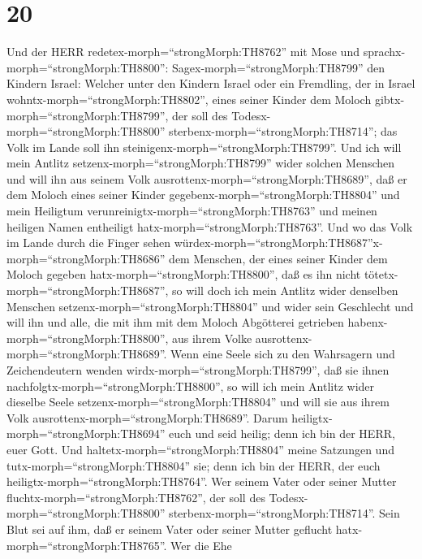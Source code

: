 \hypertarget{section-19}{%
\section{20}\label{section-19}}

 Und der HERR redetex-morph=``strongMorph:TH8762'' mit Mose
und sprachx-morph=``strongMorph:TH8800'': 
Sagex-morph=``strongMorph:TH8799'' den Kindern Israel: Welcher unter den
Kindern Israel oder ein Fremdling, der in Israel
wohntx-morph=``strongMorph:TH8802'', eines seiner Kinder dem Moloch
gibtx-morph=``strongMorph:TH8799'', der soll des
Todesx-morph=``strongMorph:TH8800''
sterbenx-morph=``strongMorph:TH8714''; das Volk im Lande soll ihn
steinigenx-morph=``strongMorph:TH8799''.  Und ich will mein
Antlitz setzenx-morph=``strongMorph:TH8799'' wider solchen Menschen und
will ihn aus seinem Volk ausrottenx-morph=``strongMorph:TH8689'', daß er
dem Moloch eines seiner Kinder gegebenx-morph=``strongMorph:TH8804'' und
mein Heiligtum verunreinigtx-morph=``strongMorph:TH8763'' und meinen
heiligen Namen entheiligt hatx-morph=``strongMorph:TH8763''.
 Und wo das Volk im Lande durch die Finger sehen
würdex-morph=``strongMorph:TH8687''x-morph=``strongMorph:TH8686'' dem
Menschen, der eines seiner Kinder dem Moloch gegeben
hatx-morph=``strongMorph:TH8800'', daß es ihn nicht
tötetx-morph=``strongMorph:TH8687'',  so will doch ich mein
Antlitz wider denselben Menschen setzenx-morph=``strongMorph:TH8804''
und wider sein Geschlecht und will ihn und alle, die mit ihm mit dem
Moloch Abgötterei getrieben habenx-morph=``strongMorph:TH8800'', aus
ihrem Volke ausrottenx-morph=``strongMorph:TH8689''.  Wenn
eine Seele sich zu den Wahrsagern und Zeichendeutern wenden
wirdx-morph=``strongMorph:TH8799'', daß sie ihnen
nachfolgtx-morph=``strongMorph:TH8800'', so will ich mein Antlitz wider
dieselbe Seele setzenx-morph=``strongMorph:TH8804'' und will sie aus
ihrem Volk ausrottenx-morph=``strongMorph:TH8689''.  Darum
heiligtx-morph=``strongMorph:TH8694'' euch und seid heilig; denn ich bin
der HERR, euer Gott.  Und
haltetx-morph=``strongMorph:TH8804'' meine Satzungen und
tutx-morph=``strongMorph:TH8804'' sie; denn ich bin der HERR, der euch
heiligtx-morph=``strongMorph:TH8764''.  Wer seinem Vater
oder seiner Mutter fluchtx-morph=``strongMorph:TH8762'', der soll des
Todesx-morph=``strongMorph:TH8800''
sterbenx-morph=``strongMorph:TH8714''. Sein Blut sei auf ihm, daß er
seinem Vater oder seiner Mutter geflucht
hatx-morph=``strongMorph:TH8765''.  Wer die Ehe
